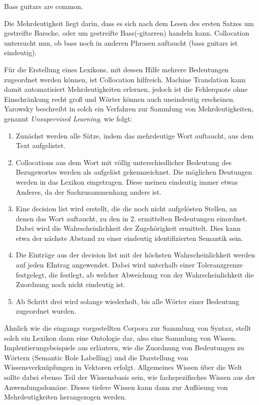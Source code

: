 \documentclass[12pt]{report}
\begin{document}
Bass guitars are common.
\rm

Die Mehrdeutigkeit liegt darin, dass es sich nach dem Lesen des ersten Satzes um gestreifte Barsche, oder um gestreifte Bass(-gitarren) handeln kann. Collocation untersucht nun, ob bass noch in anderen Phrasen auftaucht (bass guitars ist eindeutig).

Für die Erstellung eines Lexikons, mit dessen Hilfe mehrere Bedeutungen zugeordnet werden können, ist Collocation hilfreich. Machine Translation kann damit automatisiert Mehrdeutigkeiten erlernen, jedoch ist die Fehlerquote ohne Einschränkung recht groß und Wörter können auch uneindeutig erscheinen. Yarowsky beschreibt in \cite{yar95} solch ein Verfahren zur Sammlung von Mehrdeutigkeiten, genannt \textit{Unsupervised Learning}, wie folgt: 

\begin{enumerate}
\item Zunächst werden alle Sätze, indem das mehrdeutige Wort auftaucht, aus dem Text aufgelistet.
\item Collocations aus dem Wort mit völlig unterschiedlicher Bedeutung des Bezugswortes werden als aufgelöst gekennzeichnet. Die möglichen Deutungen werden in das Lexikon eingetragen. Diese meinen eindeutig immer etwas Anderes, da der Sachzusammenhang anders ist.
\item Eine decision list wird erstellt, die die noch nicht aufgelösten Stellen, an denen das Wort auftaucht, zu den in 2. ermittelten Bedeutungen einordnet. Dabei wird die Wahrscheinlichkeit der Zugehörigkeit ermittelt. Dies kann etwa der nächste Abstand zu einer eindeutig identifizierten Semantik sein.
\item Die Einträge aus der decision list mit der höchsten Wahrscheinlichkeit werden auf jeden EIntrag angewendet. Dabei wird unterhalb einer Toleranzgrenze festgelegt, die festlegt, ab welcher Abweichung von der Wahrscheinlichkeit die Zuordnung noch nicht eindeutig ist. 
\item Ab Schritt drei wird solange wiederholt, bis alle Wörter einer Bedeutung zugeordnet wurden.
\end{enumerate} 

Ähnlich wie die eingangs vorgestellten Corpora zur Sammlung von Syntax, stellt solch ein Lexikon dann eine Ontologie dar, also eine Sammlung von Wissen. Implentierungsbeispiele aus \cite{col11} erläutern, wie die Zuordnung von Bedeutungen zu Wörtern (Semantic Role Labelling) und die Darstellung von Wissensverknüpfungen in Vektoren erfolgt. Allgemeines Wissen über die Welt sollte dabei ebenso Teil der Wissensbasis sein, wie fachspezifisches Wissen aus der Anwendungsdomäne. Dieses tiefere Wissen kann dann zur Auflösung von Mehrdeutigkeiten herangezogen werden.
\end{document}

